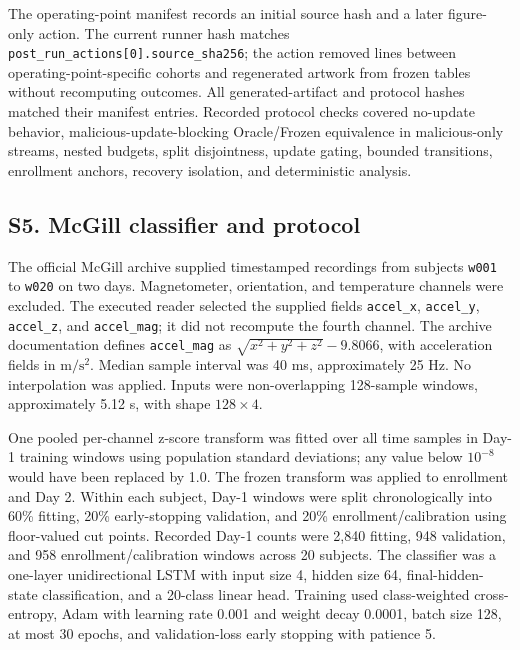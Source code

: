 \documentclass[technologies,supfile,submit,moreauthors]{Definitions/mdpi}
\begin{document}
The operating-point manifest records an initial source hash and a later figure-only action. The current runner hash matches \texttt{post\_run\_actions{[}0{]}.source\_sha256}; the action removed lines between operating-point-specific cohorts and regenerated artwork from frozen tables without recomputing outcomes. All generated-artifact and protocol hashes matched their manifest entries. Recorded protocol checks covered no-update behavior, malicious-update-blocking Oracle/Frozen equivalence in malicious-only streams, nested budgets, split disjointness, update gating, bounded transitions, enrollment anchors, recovery isolation, and deterministic analysis.

\subsection*{S5. McGill classifier and protocol}\label{sm:s5}

The official McGill archive supplied timestamped recordings from subjects \texttt{w001} to \texttt{w020} on two days. Magnetometer, orientation, and temperature channels were excluded. The executed reader selected the supplied fields \texttt{accel\_x}, \texttt{accel\_y}, \texttt{accel\_z}, and \texttt{accel\_mag}; it did not recompute the fourth channel. The archive documentation defines \texttt{accel\_mag} as \(\sqrt{x^2+y^2+z^2}-9.8066\), with acceleration fields in \(\mathrm{m/s^2}\). Median sample interval was 40 ms, approximately 25 Hz. No interpolation was applied. Inputs were non-overlapping 128-sample windows, approximately 5.12 s, with shape \(128\times4\).

One pooled per-channel z-score transform was fitted over all time samples in Day-1 training windows using population standard deviations; any value below \(10^{-8}\) would have been replaced by 1.0. The frozen transform was applied to enrollment and Day 2. Within each subject, Day-1 windows were split chronologically into 60\% fitting, 20\% early-stopping validation, and 20\% enrollment/calibration using floor-valued cut points. Recorded Day-1 counts were 2,840 fitting, 948 validation, and 958 enrollment/calibration windows across 20 subjects. The classifier was a one-layer unidirectional LSTM with input size 4, hidden size 64, final-hidden-state classification, and a 20-class linear head. Training used class-weighted cross-entropy, Adam with learning rate 0.001 and weight decay 0.0001, batch size 128, at most 30 epochs, and validation-loss early stopping with patience 5.
\end{document}
